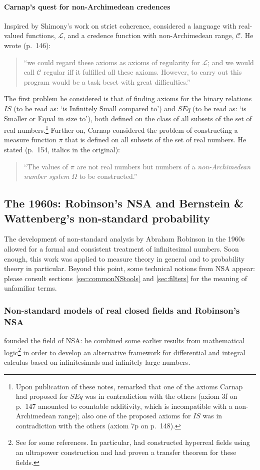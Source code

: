 \paragraph{Carnap's quest for non-Archimedean credences}
Inspired by Shimony's work on strict coherence, \citet{Carnap:1980} considered a language with real-valued functions, $\mathcal{L}$, and a credence function with non-Archimedean range, $\mathcal{C}$. He wrote (p.~146):
\begin{quote}
``we could regard these axioms as axioms of regularity for $\mathcal{L}$; and we would call $\mathcal{C}$ regular iff it fulfilled all these axioms. However, to carry out this program would be a task beset with great difficulties.''
\end{quote}
The first problem he considered is that of finding axioms for the binary relations $IS$ (to be read as: `is Infinitely Small compared to') and $SEq$ (to be read as: `is Smaller or Equal in size to'), both defined on the class of all subsets of the set of real numbers.\footnote{Upon publication of these notes, \citet{Hoover:1980} remarked that one of the axioms Carnap had proposed for $SEq$ was in contradiction with the others (axiom 3f on p.~147 amounted to countable additivity, which is incompatible with a non-Archimedean range); also one of the proposed axioms for $IS$ was in contradiction with the others (axiom 7p on p.~148).} Further on, Carnap considered the problem of constructing a measure function $\pi$ that is defined on all subsets of the set of real numbers. He stated (p.~154, italics in the original):
\begin{quote}
``The values of $\pi$ are not real numbers but numbers of a \emph{non-Archimedean number system} $\Omega$ to be constructed.''
\end{quote}

\subsection{The 1960s: Robinson's NSA and Bernstein \& Wattenberg's non-standard probability}
The development of non-standard analysis by Abraham Robinson in the 1960s allowed for a formal and consistent treatment of infinitesimal numbers. Soon enough, this work was applied to measure theory in general and to probability theory in particular. Beyond this point, some technical notions from NSA appear: please consult sections~\ref{sec:commonNStools} and \ref{sec:filters} for the meaning of unfamiliar terms.

\subsubsection{Non-standard models of real closed fields and Robinson's NSA}\label{sec:RCFs}
\citet{Robinson:1961,Robinson:1966} founded the field of NSA: he combined some earlier results from mathematical logic\footnote{See \citet[p.~48]{Robinson:1966} for some references. In particular, \citet{Hewitt:1948} had constructed hyperreal fields using an ultrapower construction and \citet{Los:1955} had proven a transfer theorem for these fields.} in order to develop an alternative framework for differential and integral calculus based on infinitesimals and infinitely large numbers.


